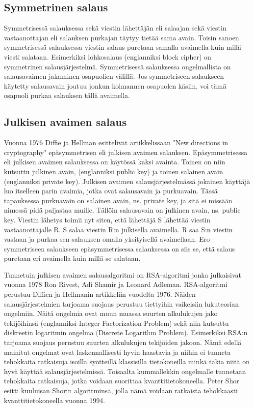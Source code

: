 \subsection{Symmetrinen salaus}
 Symmetrisessä salauksessa sekä viestin lähettäjän eli salaajan sekä viestin vastaanottajan eli salauksen purkajan täytyy tietää sama avain. Toisin sanoen symmetrisessä salauksessa viestin salaus puretaan samalla avaimella kuin millä viesti salataan. Esimerkiksi lohkosalaus (englanniksi block cipher) on symmetrinen salausjärjestelmä. Symmetrisessä salauksessa ongelmallista on salausavaimen jakaminen osapuolien välillä. Jos symmetriseen salaukseen käytetty salausavain joutuu jonkun kolmannen osapuolen käsiin, voi tämä osapuoli purkaa salauksen tällä avaimella.
 
 \subsection{Julkisen avaimen salaus}
 Vuonna 1976 Diffie ja Hellman esittelivät artikkelissaan "New directions in cryptography" epäsymmetrisen eli julkisen avaimen salauksen. Epäsymmetrisessa eli julkisen avaimen salauksessa on käytössä kaksi avainta. Toinen on niin kutsuttu julkinen avain, (englanniksi public key) ja toinen salainen avain (englanniksi private key). Julkisen avaimen salausjärjestelmässä jokainen käyttäjä luo itselleen parin avaimia, jotka ovat salausavain ja purkuavain. Tässä tapauksessa purkuavain on salainen avain, ns. private key,  ja sitä ei missään nimessä pidä paljastaa muille. Tällöin salausavain on julkinen avain, ns. public key. Viestin lähetys toimii nyt siten, että lähettäjä S lähettää viestin vastaanottajalle R. S salaa viestin R:n julkisella avaimella. R saa S:n viestin vastaan ja purkaa sen salauksen omalla yksityisellä avaimellaan. Ero symmetriseen salaukseen epäsymmetrisessa salauksessa on siis se, että salaus puretaan eri avaimella kuin millä se salataan.
 
 Tunnetuin julkisen avaimen salausalgoritmi on RSA-algoritmi jonka julkaisivat vuonna 1978 Ron Rivest, Adi Shamir ja Leonard Adleman. RSA-algoritmi perustuu Diffien ja Hellmanin artikkeliin vuodelta 1976. Näiden salausjärjestelmien tarjoama suojaus perustuu tiettyihin vaikeisiin lukuteorian ongelmiin. Näitä ongelmia ovat muun muassa suurten alkulukujen jako tekijöihinsä (englanniksi Integer Factorization Problem) sekä niin kutsuttu diskreetin logaritmin ongelma (Discrete Logarithm Problem). Esimerkiksi RSA:n tarjoama suojaus perustuu suurten alkulukujen tekijöiden jakoon. Nämä edellä mainitut ongelmat ovat laskennallisesti hyvin haastavia ja niihin ei tunneta tehokkaita ratkaisuja isoilla syötteillä klassisilla tietokoneilla minkä takia niitä on hyvä käyttää salausjärjestelmissä. Toisaalta kummallekkin ongelmalle tunnetaan tehokkaita ratkaisuja, jotka voidaan suorittaa kvanttitietokoneella. Peter Shor esitti kuuluisan Shorin algoritminsa, jolla nämä voidaan ratkaista tehokkaasti kvanttitietokoneella vuonna 1994.
 
